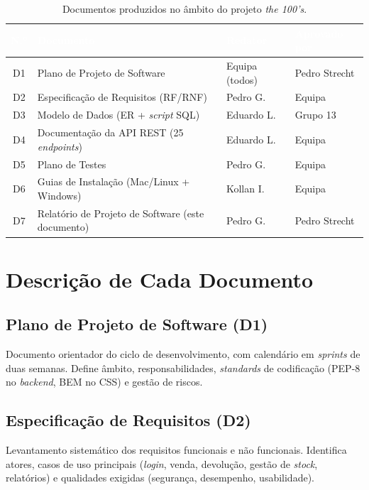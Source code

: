 \documentclass[11pt,a4paper]{report}
\begin{document}
\begin{table}[H]
\centering\small
\begin{tabularx}{\textwidth}{c L{6.2cm} L{3cm} L{3cm}}
\toprule
{}
\textbf{\textcolor{white}{N.º}} &
\textbf{\textcolor{white}{Documento}} &
\textbf{\textcolor{white}{Redator}} &
\textbf{\textcolor{white}{Aprovado por}} \\
\midrule
D1 & Plano de Projeto de Software & Equipa (todos) & Pedro Strecht \\
D2 & Especificação de Requisitos (RF/RNF) & Pedro G. & Equipa \\
D3 & Modelo de Dados (ER + \textit{script} SQL) & Eduardo L. & Grupo 13 \\
D4 & Documentação da API REST (25 \textit{endpoints}) & Eduardo L. & Equipa \\
D5 & Plano de Testes & Pedro G. & Equipa \\
D6 & Guias de Instalação (Mac/Linux + Windows) & Kollan I. & Equipa \\
D7 & Relatório de Projeto de Software (este documento) & Pedro G. & Pedro Strecht \\
\bottomrule
\end{tabularx}
\caption{Documentos produzidos no âmbito do projeto \textit{the 100's}.}
\label{tab:documentos}
\end{table}

\section{Descrição de Cada Documento}

\subsection{Plano de Projeto de Software (D1)}
Documento orientador do ciclo de desenvolvimento, com calendário em \textit{sprints} de duas semanas. Define âmbito, responsabilidades, \textit{standards} de codificação (PEP-8 no \textit{backend}, BEM no CSS) e gestão de riscos.

\subsection{Especificação de Requisitos (D2)}
Levantamento sistemático dos requisitos funcionais e não funcionais. Identifica atores, casos de uso principais (\textit{login}, venda, devolução, gestão de \textit{stock}, relatórios) e qualidades exigidas (segurança, desempenho, usabilidade).
\end{document}

